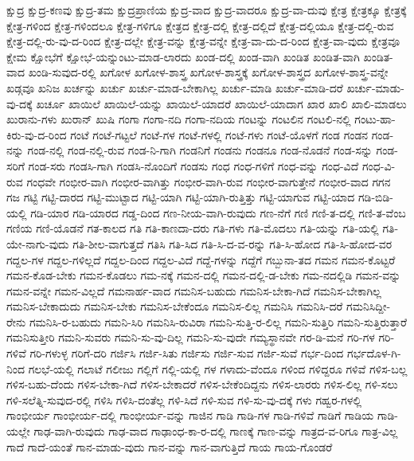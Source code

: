 {ಕ್ಷುದ್ರ
ಕ್ಷುದ್ರ-ಕಣವು
ಕ್ಷುದ್ರ-ತಮ
ಕ್ಷುದ್ರಪ್ರಾಣಿಯ
ಕ್ಷುದ್ರ-ವಾದ
ಕ್ಷುದ್ರ-ವಾದರೂ
ಕ್ಷುದ್ರ-ವಾ-ದುವು
ಕ್ಷೇತ್ರ
ಕ್ಷೇತ್ರಕ್ಕೂ
ಕ್ಷೇತ್ರಕ್ಕೆ
ಕ್ಷೇತ್ರ-ಗಳಿಂದ
ಕ್ಷೇತ್ರ-ಗಳಿಂದಲೂ
ಕ್ಷೇತ್ರ-ಗಳಿಗೂ
ಕ್ಷೇತ್ರದ
ಕ್ಷೇತ್ರ-ದಲ್ಲಿ
ಕ್ಷೇತ್ರ-ದಲ್ಲಿದೆ
ಕ್ಷೇತ್ರ-ದಲ್ಲಿಯೂ
ಕ್ಷೇತ್ರ-ದಲ್ಲಿ-ರುವ
ಕ್ಷೇತ್ರ-ದಲ್ಲಿ-ರು-ವು-ದ-ರಿಂದ
ಕ್ಷೇತ್ರ-ದಲ್ಲೇ
ಕ್ಷೇತ್ರ-ವನ್ನು
ಕ್ಷೇತ್ರ-ವನ್ನೇ
ಕ್ಷೇತ್ರ-ವಾ-ದು-ದ-ರಿಂದ
ಕ್ಷೇತ್ರ-ವಾ-ವುದು
ಕ್ಷೇತ್ರವೂ
ಕ್ಷೇಮ
ಕ್ಷೋಭೆಗೆ
ಕ್ಷೋಭೆ-ಯನ್ನುಂಟು-ಮಾಡ-ಲಾರದು
ಖಂಡ-ದಲ್ಲಿ
ಖಂಡ-ವಾಗಿ
ಖಂಡಿತ
ಖಂಡಿತ-ವಾಗಿ
ಖಂಡಿತ-ವಾದ
ಖಂಡಿ-ಸುವುದ-ರಲ್ಲಿ
ಖಗೋಳ
ಖಗೋಳ-ಶಾಸ್ತ್ರ
ಖಗೋಳ-ಶಾಸ್ತ್ರಕ್ಕೆ
ಖಗೋಳ-ಶಾಸ್ತ್ರದ
ಖಗೋಳ-ಶಾಸ್ತ್ರ-ವನ್ನೇ
ಖಡ್ಗವೂ
ಖನಿಜ
ಖರ್ಚನ್ನು
ಖರ್ಚು
ಖರ್ಚು-ಮಾಡ-ಬೇಕಾಗಿಲ್ಲ
ಖರ್ಚು-ಮಾಡಿ
ಖರ್ಚು-ಮಾಡಿ-ದರೆ
ಖರ್ಚು-ಮಾಡು-ವು-ದಕ್ಕೆ
ಖರ್ಚೂ
ಖಾಯಿಲೆ
ಖಾಯಿಲೆ-ಯನ್ನು
ಖಾಯಿಲೆ-ಯಾದರೆ
ಖಾಯಿಲೆ-ಯಾದಾಗ
ಖಾರ
ಖಾಲಿ
ಖಾಲಿ-ಮಾಡಲು
ಖುರಾನು-ಗಳು
ಖುರಾನ್
ಖುಷಿ
ಗಂಗಾ
ಗಂಗಾ-ನದಿ
ಗಂಗಾ-ನದಿಯ
ಗಂಟನ್ನು
ಗಂಟಲಿನ
ಗಂಟಲಿ-ನಲ್ಲಿ
ಗಂಟು-ಹಾ-ಕಿರು-ವು-ದ-ರಿಂದ
ಗಂಟೆ
ಗಂಟೆ-ಗಟ್ಟಲೆ
ಗಂಟೆ-ಗಳ
ಗಂಟೆ-ಗಳಲ್ಲಿ
ಗಂಟೆ-ಗಳು
ಗಂಟೆ-ಯೊಳಗೆ
ಗಂಡ
ಗಂಡನ
ಗಂಡ-ನನ್ನು
ಗಂಡ-ನಲ್ಲಿ
ಗಂಡ-ನಲ್ಲಿ-ರುವ
ಗಂಡ-ನಿ-ಗಾಗಿ
ಗಂಡನಿಗೆ
ಗಂಡನು
ಗಂಡನೂ
ಗಂಡ-ನೊಡನೆ
ಗಂಡ-ಸನ್ನು
ಗಂಡ-ಸರಿಗೆ
ಗಂಡ-ಸರು
ಗಂಡಸಿ-ಗಾಗಿ
ಗಂಡಸಿ-ನೊಂದಿಗೆ
ಗಂಡಸು
ಗಂಧ
ಗಂಧ-ಗಳಿಗೆ
ಗಂಧ-ವನ್ನು
ಗಂಧ-ವಿದೆ
ಗಂಧ-ವಿ-ರುವ
ಗಂಧವೇ
ಗಂಭೀರ-ವಾಗಿ
ಗಂಭೀರ-ವಾಗಿತ್ತು
ಗಂಭೀರ-ವಾಗಿ-ರುವ
ಗಂಭೀರ-ವಾಗುತ್ತೇನೆ
ಗಂಭೀರ-ವಾದ
ಗಗನ
ಗಜ
ಗಟ್ಟಿ
ಗಟ್ಟಿ-ದಾರದ
ಗಟ್ಟಿ-ಮುಟ್ಟಾದ
ಗಟ್ಟಿ-ಯಾಗಿ
ಗಟ್ಟಿ-ಯಾಗಿ-ರುತ್ತಿತ್ತು
ಗಟ್ಟಿ-ಯಾಗುವ
ಗಟ್ಟಿ-ಯಾದ
ಗಡಿ-ಬಿಡಿ-ಯಲ್ಲಿ
ಗಡಿ-ಯಾರ
ಗಡಿ-ಯಾರದ
ಗಡ್ಡ-ದಿಂದ
ಗಣ-ನೀಯ-ವಾಗಿ-ರುವುದು
ಗಣ-ನೆಗೆ
ಗಣಿ
ಗಣಿ-ತ-ದಲ್ಲಿ
ಗಣಿ-ತ-ವೆಂಬ
ಗಣಿಯ
ಗಣಿ-ಯೊಡನೆ
ಗತ-ಕಾಲದ
ಗತಿ
ಗತಿ-ಕಾಣದಾ-ದರು
ಗತಿ-ಗಳು
ಗತಿ-ಮೊದಲು
ಗತಿ-ಯನ್ನು
ಗತಿ-ಯಲ್ಲಿ
ಗತಿ-ಯೇ-ನಾಗು-ವುದು
ಗತಿ-ಶೀಲ-ವಾಗುತ್ತದೆ
ಗತಿಸಿ
ಗತಿ-ಸಿದ
ಗತಿ-ಸಿ-ದ-ವ-ರನ್ನು
ಗತಿ-ಸಿ-ಹೋದ
ಗತಿ-ಸಿ-ಹೋದ-ವರ
ಗದ್ದಲ-ಗಳ
ಗದ್ದಲ-ಗಳಿಲ್ಲದೆ
ಗದ್ದಲ-ದಿಂದ
ಗದ್ದಲ-ವಿದೆ
ಗದ್ದೆ-ಗಳನ್ನು
ಗದ್ದೆಗೆ
ಗಬ್ಬುನಾ-ತದ
ಗಮನ
ಗಮನ-ಕೊಟ್ಟರೆ
ಗಮನ-ಕೊಡ-ಬೇಕು
ಗಮನ-ಕೊಡಲು
ಗಮ-ನಕ್ಕೆ
ಗಮನ-ದಲ್ಲಿ
ಗಮನ-ದಲ್ಲಿ-ಡ-ಬೇಕು
ಗಮ-ನದಲ್ಲಿಡಿ
ಗಮನ-ವನ್ನು
ಗಮನ-ವನ್ನೇ
ಗಮನ-ವಿಲ್ಲದೆ
ಗಮನಾರ್ಹ-ವಾದ
ಗಮನಿಸ-ಬಹುದು
ಗಮನಿಸ-ಬೇಕಾ-ಗಿದೆ
ಗಮನಿಸ-ಬೇಕಾಗಿಲ್ಲ
ಗಮನಿಸ-ಬೇಕಾದುದು
ಗಮನಿಸ-ಬೇಕು
ಗಮನಿಸ-ಬೇಕೆಂದೂ
ಗಮನಿಸ-ಲಿಲ್ಲ
ಗಮನಿಸಿ
ಗಮನಿಸಿ-ದರೆ
ಗಮನಿಸಿದ್ದೀ-ರೇನು
ಗಮನಿಸಿ-ರ-ಬಹುದು
ಗಮನಿ-ಸಿರಿ
ಗಮನಿಸಿ-ರುವಿರಾ
ಗಮನಿ-ಸುತ್ತಿ-ರ-ಲಿಲ್ಲ
ಗಮನಿ-ಸುತ್ತಿರಿ
ಗಮನಿ-ಸುತ್ತಿರುತ್ತಾರೆ
ಗಮನಿಸುತ್ತೀರಿ
ಗಮನಿ-ಸುವರು
ಗಮನಿ-ಸು-ವು-ದಿಲ್ಲ
ಗಮನಿ-ಸು-ವುದೇ
ಗಮ್ಯಸ್ಥಾನವೇ
ಗರ-ಡಿ-ಮನೆ
ಗರಿ-ಗಳ
ಗರಿ-ಗಳಿವೆ
ಗರಿ-ಗಳುಳ್ಳ
ಗರಿಗೆ-ದರಿ
ಗರ್ಜಿಸಿ
ಗರ್ಜಿ-ಸಿತು
ಗರ್ಜಿಸು
ಗರ್ಜಿ-ಸುವ
ಗರ್ಜಿ-ಸುವೆ
ಗರ್ಭ-ದಿಂದ
ಗರ್ಭದೊಳ-ಗಿ-ನಿಂದ
ಗಲಭೆ-ಯಲ್ಲಿ
ಗಲಾಟೆ
ಗಲೀಜು
ಗಲ್ಲಿಗೆ
ಗಲ್ಲಿ-ಯಲ್ಲಿ
ಗಳ
ಗಳಾದು-ವೆಂದೂ
ಗಳಿಂದ
ಗಳಿದ್ದರೂ
ಗಳಿವೆ
ಗಳಿಸ-ಬಲ್ಲ
ಗಳಿಸ-ಬಹು-ದೆಂದು
ಗಳಿಸ-ಬೇಕಾ-ಗಿದೆ
ಗಳಿಸ-ಬೇಕಾದರೆ
ಗಳಿಸ-ಬೇಕೆಂದಿದ್ದನು
ಗಳಿಸ-ಲಾರರು
ಗಳಿಸ-ಲಿಲ್ಲ
ಗಳಿ-ಸಲು
ಗಳಿ-ಸಲೆತ್ನಿ-ಸುವುದ-ರಲ್ಲಿ
ಗಳಿಸಿ
ಗಳಿಸಿ-ದಂತೆಲ್ಲ
ಗಳಿ-ಸಿದೆ
ಗಳಿ-ಸುವ
ಗಳಿ-ಸು-ವು-ದಕ್ಕೆ
ಗಳು
ಗಹ್ವರ-ಗಳಲ್ಲಿ
ಗಾಂಭೀರ್ಯ
ಗಾಂಭೀರ್ಯ-ದಲ್ಲಿ
ಗಾಂಭೀರ್ಯ-ವನ್ನು
ಗಾಜಿನ
ಗಾಡಿ
ಗಾಡಿ-ಗಳ
ಗಾಡಿ-ಗಳಿವೆ
ಗಾಡಿಗೆ
ಗಾಡಿಯ
ಗಾಡಿ-ಯಲ್ಲೇ
ಗಾಢ-ವಾಗಿ-ರುವುದು
ಗಾಢ-ವಾದ
ಗಾಢಾಂಧ-ಕಾ-ರ-ದಲ್ಲಿ
ಗಾಣಕ್ಕೆ
ಗಾಣ-ವನ್ನು
ಗಾತ್ರದ-ವ-ರಿಗೂ
ಗಾತ್ರ-ವಿಲ್ಲ
ಗಾದೆ
ಗಾದೆ-ಯಂತೆ
ಗಾನ-ಮಾಡು-ವುದು
ಗಾನ-ವನ್ನು
ಗಾನ-ವಾಗುತ್ತಿದೆ
ಗಾಯ
ಗಾಯ-ಗೊಂಡರೆ
}
